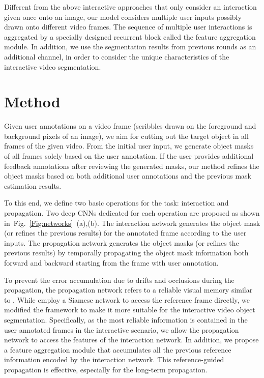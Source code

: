 \documentclass[10pt,twocolumn,letterpaper]{article}
\newcommand{\fref}[1]{Fig.~\ref{#1}}
\begin{document}
Different from the above interactive approaches that only consider an interaction given once onto an image, our model considers multiple user inputs possibly drawn onto different video frames. 
The sequence of multiple user interactions is aggregated by a specially designed recurrent block called the feature aggregation module.
In addition, we use the segmentation results from previous rounds as an additional channel, in order to consider the unique characteristics of the interactive video segmentation.




\section{Method}
Given user annotations on a video frame (\eg scribbles drawn on the foreground and background pixels of an image), we aim for cutting out the target object in all frames of the given video.
From the initial user input, we generate object masks of all frames solely based on the user annotation.
If the user provides additional feedback annotations after reviewing the generated masks, our method refines the object masks based on both additional user annotations and the previous mask estimation results.

To this end, we define two basic operations for the task: interaction and propagation. Two deep CNNs dedicated for each operation are proposed as shown in~\fref{Fig:networks}~(a),(b). 
The interaction network generates the object mask (or refines the previous results) for the annotated frame according to the user inputs. 
The propagation network generates the object masks (or refines the previous results) by temporally propagating the object mask information both forward and backward starting from the frame with user annotation. 

To prevent the error accumulation due to drifts and occlusions during the propagation, the propagation network refers to a reliable visual memory similar to \cite{oh2018fast, yang2018efficient, yoon2017pixel}. While \cite{oh2018fast, yoon2017pixel} employ a Siamese network to access the reference frame directly, we modified the framework to make it more suitable for the interactive video object segmentation.
Specifically, as the most reliable information is contained in the user annotated frames in the interactive scenario, we allow the propagation network to access the features of the interaction network. In addition, we propose a feature aggregation module that accumulates all the previous reference information encoded by the interaction network. This reference-guided propagation is effective, especially for the long-term propagation.
\end{document}

